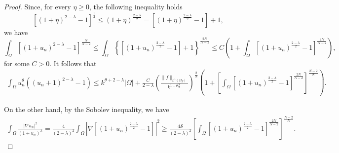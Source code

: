 \documentclass[10pt,a4paper]{amsart}
\newcommand{\abs}[1]{\left|#1\right|}
\def\elleomT#1{L^{#1}(\Omega_T)}
\def\io{\int_\Omega}
\def\norma#1#2{ \|#1 \|_{#2}}
\begin{document}
\begin{proof}
    Since, for every $\eta\geq0$, the following inequality holds
    $$
    \left[(1+\eta)^{2-\lambda}-1\right]^{\frac{1}{2}} \leq(1+\eta)^{\frac{2-\lambda}{2}}=\left[(1+\eta)^{\frac{2-\lambda}{2}}-1\right]+1,
    $$
    we have
    $$
    \io\left[\left(1+u_n\right)^{2-\lambda}-1\right]^{\frac{N}{N-2}} 
    \leq 
    \io\left\{\left[\left(1+u_n\right)^{\frac{2-\lambda}{2}}-1\right]+1\right\}^{{\frac{2N}{N-2}}} 
    \leq 
    C \left(1+\io\left[\left(1+u_n\right)^{\frac{2-\lambda}{2}}-1\right]^{{\frac{2N}{N-2}}}\right),
    $$
    for some $C>0$.
    It follows that
        \begin{equation}\label{eq:proof:stima1**:eq3}
        \begin{split}
            \io u_n^{\theta} \left((u_n+1)^{2-\lambda}-1\right)
    \leq 
    k^{\theta+2-\lambda}\abs{\Omega}
    +    \frac{C}{2-\lambda}
    \left(\frac{\norma{f}{\elleomT1}}{k^{1-\theta\frac{N}{2}}}\right)^\frac{2}{N}
    \left(1+\left[\io\left[\left(1+u_n\right)^{\frac{2-\lambda}{2}}-1\right]^{{\frac{2N}{N-2}}}\right]^{\frac{N-2}{N}}\right).
        \end{split}
    \end{equation}

    On the other hand, by the Sobolev inequality, we have
    \begin{equation}\label{eq:proof:stima1**:eq2}
        \begin{split}
            \io \frac{\left|\nabla u_n\right|^2}{\left(1+u_n\right)^\lambda}=
    \frac{4}{(2-\lambda)^2} \int_{\Omega}\left|\nabla\left[\left(1+u_n\right)^{\frac{2-\lambda}{2}}-1\right]\right|^2 \geq 
    \frac{4 \mathcal{S}}{(2-\lambda)^2}\left[\int_{\Omega}\left[\left(1+u_n\right)^{\frac{2-\lambda}{2}}-1\right]^{{\frac{2N}{N-2}}}\right]^{\frac{N-2}{N}}.
        \end{split}
    \end{equation}
    

\end{proof}
\end{document}
